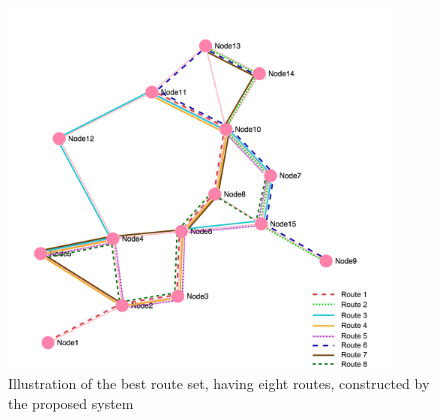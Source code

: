 \begin{figure}[H]
    \begin{center}
    \includegraphics[width=4in]{assets/mandlnetwork_8routes.png}
    \end{center}
    \caption{Illustration of the best route set, having eight routes, constructed by the proposed system}
    \label{fig:bestRouteSet8} 
\end{figure}

